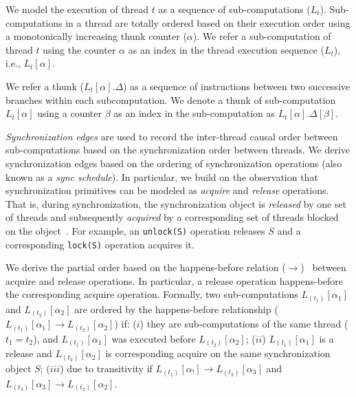 We model the execution of thread $t$ as a sequence of sub-computations ($L_t$).  Sub-computations in a thread are totally ordered based on their execution order using a monotonically increasing thunk counter ($\alpha$). We refer a sub-computation of thread $t$ using the counter $\alpha$ as an index in the thread execution sequence ($L_t$), i.e., $L_t[\alpha]$.  

We refer a thunk ($L_t[\alpha].\Delta$) as a sequence of instructions between two successive branches within each subcomputation. We denote a thunk of sub-computation $L_t[\alpha]$ using a counter $\beta$ as an index in the sub-computation as $L_t[\alpha].\Delta[\beta]$.  


  {\em Synchronization edges}   are
used to record the inter-thread causal order between sub-computations based on the synchronization order between threads. 
We derive synchronization edges based on the ordering of synchronization operations (also known as a {\em sync schedule}). In particular,  we build on the observation that synchronization primitives can be modeled as {\em acquire} and {\em release} operations. That is,   during synchronization, the synchronization object is {\em released} by one set of threads and subsequently  {\em acquired} by a corresponding set of threads blocked on the object~\cite{fast-track-pldi}. For example, an {\tt unlock(S)} operation releases $S$
and a corresponding {\tt lock(S)} operation acquires it.



We derive the partial order based on the happens-before relation
($\rightarrow$)~\cite{djit,fast-track-pldi} between acquire and release operations. In particular, a release
operation happens-before the corresponding acquire operation.
Formally, two sub-computations $L_{(t_1)}[\alpha_1]$ and
$L_{(t_2)}[\alpha_2]$ are ordered by the happens-before relationship ($L_{(t_1)}[\alpha_1] \rightarrow
L_{(t_2)}[\alpha_2]$) if:  ($i$)  they are sub-computations of the
same thread ($t_1 = t_2$), and $L_{(t_1)}[\alpha_1]$ was executed before $L_{(t_2)}[\alpha_2]$; ($ii$)  $L_{(t_1)}[\alpha_1]$  is a release and $L_{(t_2)}[\alpha_2]$ is corresponding acquire on the same synchronization object $S$; ($iii$) due to transitivity if  
 $L_{(t_1)}[\alpha_!] \rightarrow L_{(t_3)}[\alpha_3] $ and $L_{(t_3)}[\alpha_3]  \rightarrow L_{(t_2)}[\alpha_2]$.


